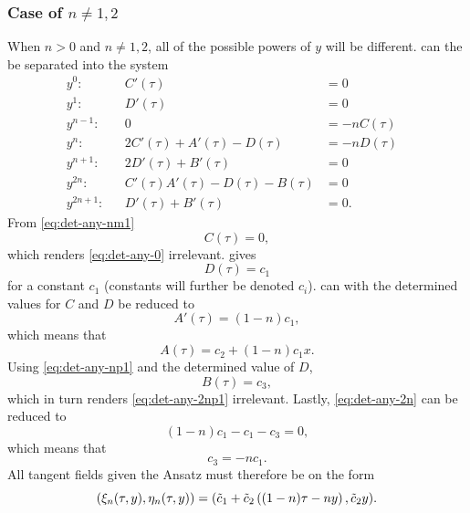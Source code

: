 \subsubsection{Case of \texorpdfstring{\(n\neq1,2\)}{n not 1 or 2}}

When \(n>0\) and \(n\neq1,2\), all of the possible powers of \(y\) will be different.
 can the be separated into the system
\begin{subequations}
  \begin{flalign}
    y^0:      && C'(\tau) &= 0                               &\label{eq:det-any-0}\\
    y^1:      && D'(\tau) &= 0                               &\label{eq:det-any-1} \\
    y^{n-1}:  && 0 &= -nC(\tau)                              &\label{eq:det-any-nm1} \\
    y^n:      && 2C'(\tau) + A'(\tau) - D(\tau) &= -nD(\tau) &\label{eq:det-any-n} \\
    y^{n+1}:  && 2D'(\tau) + B'(\tau) &= 0                   &\label{eq:det-any-np1} \\
    y^{2n}:   && C'(\tau) A'(\tau) - D(\tau) - B(\tau) &= 0  &\label{eq:det-any-2n} \\
    y^{2n+1}: && D'(\tau) + B'(\tau) &= 0.                   &\label{eq:det-any-2np1}
  \end{flalign}
\end{subequations}
From \cref{eq:det-any-nm1}
\begin{equation*}
  C(\tau) = 0,
\end{equation*}
which renders \cref{eq:det-any-0} irrelevant.
 gives
\begin{equation*}
  D(\tau) = c_1
\end{equation*}
for a constant \(c_1\) (constants will further be denoted \(c_i\)).
 can with the determined values for \(C\) and \(D\) be reduced to
\begin{equation*}
  A'(\tau) = (1-n) c_1,
\end{equation*}
which means that
\begin{equation*}
  A(\tau) = c_2 + (1-n) c_1 x.
\end{equation*}
Using \cref{eq:det-any-np1} and the determined value of \(D\),
\begin{equation*}
  B(\tau) = c_3,
\end{equation*}
which in turn renders \cref{eq:det-any-2np1} irrelevant.
Lastly, \cref{eq:det-any-2n} can be reduced to
\begin{equation*}
  (1-n) c_1 - c_1 - c_3 = 0,
\end{equation*}
which means that
\begin{equation*}
  c_3 = -n c_1.
\end{equation*}
All tangent fields given the Ansatz must therefore be on the form
\begin{equation} \label{eq:hill-tangent-field-any}
  \pqty{\xi_n(\tau,y),\eta_n(\tau,y)} = 
  \pqty{\tilde{c}_1 + \tilde{c}_2 \left( (1-n) \tau - n y \right), \tilde{c}_2 y}.
\end{equation}

